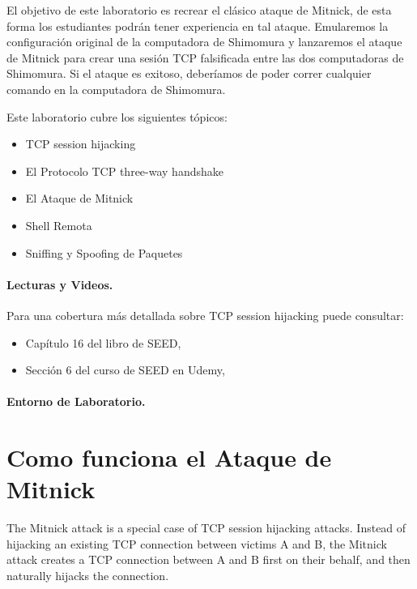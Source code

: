 El objetivo de este laboratorio es recrear el clásico ataque de Mitnick, de esta forma los estudiantes podrán tener experiencia en tal ataque.
Emularemos la configuración original de la computadora de Shimomura y lanzaremos el ataque de Mitnick para crear una sesión TCP falsificada entre las dos computadoras de Shimomura. Si el ataque es exitoso, deberíamos de poder correr cualquier comando en la computadora de Shimomura.

Este laboratorio cubre los siguientes tópicos:

\begin{itemize}[noitemsep]
\item TCP session hijacking
\item El Protocolo TCP three-way handshake 
\item El Ataque de Mitnick
\item Shell Remota \rsh
\item Sniffing y Spoofing de Paquetes
\end{itemize}


\paragraph{Lecturas y Videos.}
Para una cobertura más detallada sobre  TCP session hijacking puede consultar:

\begin{itemize}
\item Capítulo 16 del libro de SEED, \seedbook
\item Sección 6 del curso de SEED en Udemy, \seedisvideo
\end{itemize}

\paragraph{Entorno de Laboratorio.} \seedenvironmentC



\section{Como funciona el Ataque de Mitnick}

The Mitnick attack is a special case of TCP session hijacking attacks. 
Instead of hijacking an existing TCP connection between victims A and B, 
the Mitnick attack creates a TCP connection between A and B first on 
their behalf, and then naturally hijacks the connection.  


